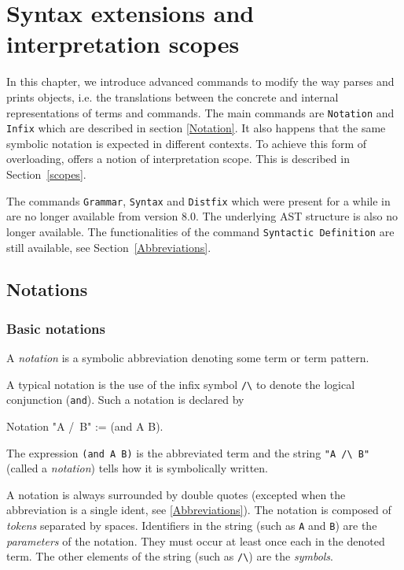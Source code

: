\chapter[Syntax extensions and interpretation scopes]{Syntax extensions and interpretation scopes\label{Addoc-syntax}}

In this chapter, we introduce advanced commands to modify the way
{\Coq} parses and prints objects, i.e. the translations between the
concrete and internal representations of terms and commands. The main
commands are {\tt Notation} and {\tt Infix} which are described in
section \ref{Notation}.  It also happens that the same symbolic
notation is expected in different contexts. To achieve this form of
overloading, {\Coq} offers a notion of interpretation scope. This is
described in Section~\ref{scopes}.

\Rem The commands {\tt Grammar}, {\tt Syntax} and {\tt Distfix} which
were present for a while in {\Coq} are no longer available from {\Coq}
version 8.0. The underlying AST structure is also no longer available.
The functionalities of the command {\tt Syntactic Definition} are
still available, see Section~\ref{Abbreviations}.

\section[Notations]{Notations\label{Notation}
}

\subsection{Basic notations}

A {\em notation} is a symbolic abbreviation denoting some term
or term pattern.

A typical notation is the use of the infix symbol \verb=/\= to denote
the logical conjunction (\texttt{and}). Such a notation is declared
by

\begin{coq_example*}
Notation "A /\ B" := (and A B).
\end{coq_example*}

The expression \texttt{(and A B)} is the abbreviated term and the
string \verb="A /\ B"= (called a {\em notation}) tells how it is 
symbolically written.

A notation is always surrounded by double quotes (excepted when the
abbreviation is a single ident, see \ref{Abbreviations}). The
notation is composed of {\em tokens} separated by spaces.  Identifiers
in the string (such as \texttt{A} and \texttt{B}) are the {\em
parameters} of the notation. They must occur at least once each in the
denoted term. The other elements of the string (such as \verb=/\=) are
the {\em symbols}.


